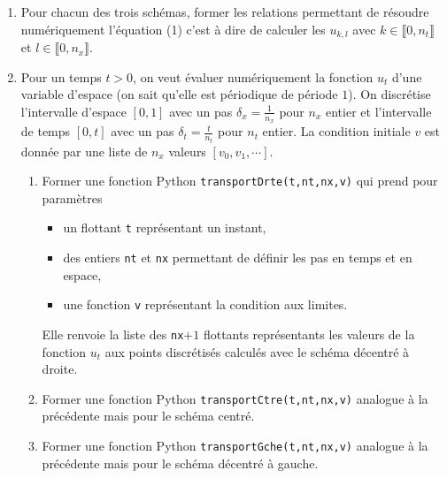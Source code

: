 \begin{enumerate}
 \item Pour chacun des trois schémas, former les relations permettant de résoudre numériquement l'équation (1) c'est à dire de calculer les $u_{k,l}$ avec $k\in \llbracket 0, n_t \rrbracket$ et $l\in \llbracket 0, n_x \rrbracket$. 
 
 \item Pour un temps $t>0$, on veut évaluer numériquement la fonction $u_t$ d'une variable d'espace (on sait qu'elle est périodique de période $1$). On discrétise l'intervalle d'espace $[0,1]$ avec un pas $\delta_x = \frac{1}{n_x}$ pour $n_x$ entier et l'intervalle de temps $[0,t]$ avec un pas $\delta_t = \frac{t}{n_t}$ pour $n_t$ entier.\newline
 La condition initiale $v$ est donnée par une liste de $n_x$ valeurs $[v_0,v_1,\cdots ]$.
 \begin{enumerate}
  \item Former une fonction Python \texttt{transportDrte(t,nt,nx,v)} qui prend pour paramètres 
  \begin{itemize}
    \item un flottant \texttt{t} représentant un instant,
    \item des entiers \texttt{nt} et \texttt{nx} permettant de définir les pas en temps et en espace,
    \item une fonction \texttt{v} représentant la condition aux limites.
  \end{itemize}
Elle renvoie la liste des \texttt{nx}$+1$ flottants représentants les valeurs de la fonction $u_t$ aux points discrétisés calculés avec le schéma décentré à droite.

  \item Former une fonction Python \texttt{transportCtre(t,nt,nx,v)} analogue à la précédente mais pour le schéma centré.
  
  \item Former une fonction Python \texttt{transportGche(t,nt,nx,v)} analogue à la précédente mais pour le schéma décentré à gauche.
 \end{enumerate}
 

\end{enumerate}
